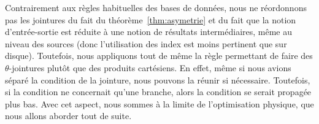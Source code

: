 Contrairement aux règles habituelles des bases de données, nous ne réordonnons pas les jointures du fait du théorème~\ref{thm:asymetrie} et du fait que la notion d'entrée-sortie est réduite à une notion de résultats intermédiaires, même au niveau des sources (donc l'utilisation des index est moins pertinent que sur disque). Toutefois, nous appliquons tout de même la règle permettant de faire des $\theta$-jointures plutôt que des produits cartésiens. En effet, même si nous avions séparé la condition de la jointure, nous pouvons la réunir si nécessaire. Toutefois, si la condition ne concernait qu'une branche, alors la condition se serait propagée plus bas. Avec cet aspect, nous sommes à la limite de l'optimisation physique, que nous allons aborder tout de suite.